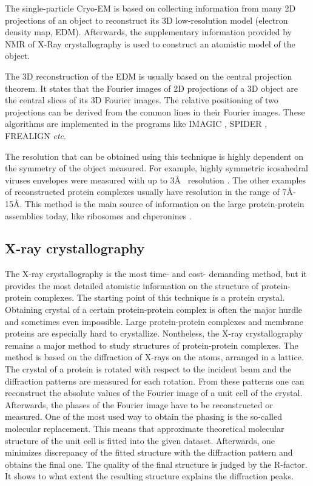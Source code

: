 The single-particle Cryo-EM is based on collecting information from many 2D projections of an object to reconstruct its 3D low-resolution model (electron density map, EDM). 
Afterwards, the supplementary information provided by NMR of X-Ray crystallography is used to construct an atomistic model of the object.

The 3D reconstruction of the EDM is usually based on the central projection theorem. It states that the Fourier images of 2D projections of a 3D object are the central slices of
its 3D Fourier images. The relative positioning of two projections can be derived from the common lines in their Fourier images. These algorithms
are implemented in the programs like IMAGIC \cite{van1996new}, SPIDER \cite{shaikh2008spider}, FREALIGN \cite{grigorieff2007frealign} \emph{etc}.

The resolution that can be obtained using this technique is highly dependent on the symmetry of the object measured. For example, highly symmetric icosahedral viruses 
envelopes were measured with up to 3\AA~ resolution \cite{zhang20103}. The other examples of reconstructed protein complexes usually have resolution in the range of 7\AA - 15\AA.
This method is the main source of information on the large protein-protein assemblies today, like ribosomes \cite{penczek2011identifying} and chperonines \cite{cong20104}.

\subsection{X-ray crystallography}
The X-ray crystallography is the most time- and cost- demanding method, but it provides the most detailed atomistic information on the structure of protein-protein 
complexes. The starting point of this technique is a protein crystal. Obtaining crystal of a certain protein-protein complex is often the major hurdle 
and sometimes even impossible. Large protein-protein complexes and membrane proteins are especially hard to crystallize. Nontheless, the X-ray crystallography 
remains a major method to study structures of protein-protein complexes. The method is based on the diffraction of X-rays on the atoms, arranged in a lattice.
The crystal of a protein is rotated with respect to the incident beam and the diffraction patterns are measured for each rotation. From these patterns
one can reconstruct the absolute values of the Fourier image of a unit cell of the crystal. Afterwards, the phases of the Fourier image have to be reconstructed
or measured. One of the most used way to obtain the phasing is the so-called molecular replacement. This means that approximate theoretical molecular structure of
the unit cell is fitted into the given dataset. Afterwards, one minimizes discrepancy of the fitted structure with the diffraction pattern and obtains the final one.
The quality of the final structure is judged by the R-factor. It shows to what extent the resulting structure explains the diffraction peaks.
